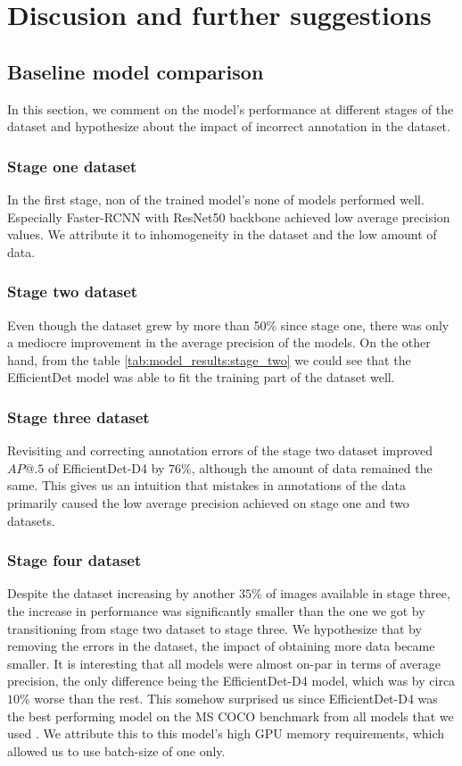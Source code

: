\chapter{Discusion and further suggestions}
\label{chapter:discusion}

\section{Baseline model comparison}
In this section, we comment on the model's performance at different stages of the dataset and hypothesize about the impact of incorrect annotation in the dataset.
\subsection{Stage one dataset}
In the first stage, non of the trained model's none of models performed well. Especially Faster-RCNN with ResNet50 backbone achieved low average precision values. We attribute it to inhomogeneity in the dataset and the low amount of data.

\subsection{Stage two dataset}
Even though the dataset grew by more than 50\% since stage one, there was only a mediocre improvement in the average precision of the models. On the other hand, from the table \ref{tab:model_results:stage_two} we could see that the EfficientDet model was able to fit the training part of the dataset well.

\subsection{Stage three dataset}
Revisiting and correcting annotation errors of the stage two dataset improved $AP@.5$ of EfficientDet-D4 by $76\%$, although the amount of data remained the same. This gives us an intuition that mistakes in annotations of the data primarily caused the low average precision achieved on stage one and two datasets.

\subsection{Stage four dataset}
Despite the dataset increasing by another $35\%$ of images available in stage three, the increase in performance was significantly smaller than the one we got by transitioning from stage two dataset to stage three. We hypothesize that by removing the errors in the dataset, the impact of obtaining more data became smaller. It is interesting that all models were almost on-par in terms of average precision, the only difference being the EfficientDet-D4 model, which was by circa $10\%$ worse than the rest. This somehow surprised us since EfficientDet-D4 was the best performing model on the MS COCO benchmark from all models that we used \cite{paperwithcode}. We attribute this to this model's high GPU memory requirements, which allowed us to use batch-size of one only.

